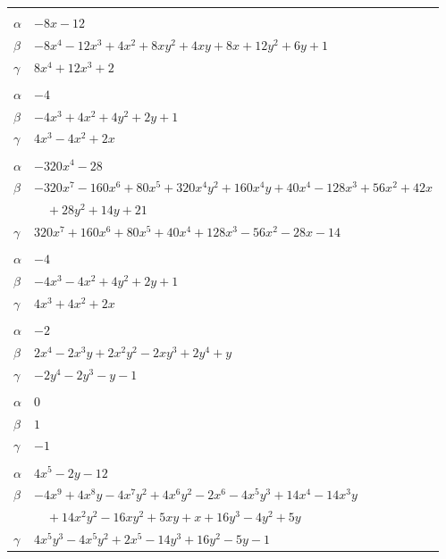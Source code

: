 \documentclass[11pt]{article}
\begin{document}
\begin{longtable}{@{}ll@{}}
\addlinespace[3pt]
\multicolumn{2}{@{}l}{$\{i,j\}=\{1,26\}$, $k_{ij}=3^{2}$}\\
$\alpha$ & $-8x-12$\\
$\beta$ & $-8x^{4}-12x^{3}+4x^{2}+8xy^{2}+4xy+8x+12y^{2}+6y+1$\\
$\gamma$ & $8x^{4}+12x^{3}+2$\\
\addlinespace[3pt]
\multicolumn{2}{@{}l}{$\{i,j\}=\{1,27\}$, $k_{ij}=3$}\\
$\alpha$ & $-4$\\
$\beta$ & $-4x^{3}+4x^{2}+4y^{2}+2y+1$\\
$\gamma$ & $4x^{3}-4x^{2}+2x$\\
\addlinespace[3pt]
\multicolumn{2}{@{}l}{$\{i,j\}=\{1,30\}$, $k_{ij}=3\cdot 7$}\\
$\alpha$ & $-320x^{4}-28$\\
$\beta$ & $-320x^{7}-160x^{6}+80x^{5}+320x^{4}y^{2}+160x^{4}y+40x^{4}-128x^{3}+56x^{2}+42x$\\
 & $\quad +28y^{2}+14y+21$\\
$\gamma$ & $320x^{7}+160x^{6}+80x^{5}+40x^{4}+128x^{3}-56x^{2}-28x-14$\\
\addlinespace[3pt]
\multicolumn{2}{@{}l}{$\{i,j\}=\{1,32\}$, $k_{ij}=3$}\\
$\alpha$ & $-4$\\
$\beta$ & $-4x^{3}-4x^{2}+4y^{2}+2y+1$\\
$\gamma$ & $4x^{3}+4x^{2}+2x$\\
\addlinespace[3pt]
\multicolumn{2}{@{}l}{$\{i,j\}=\{2,4\}$, $k_{ij}=2^{2}$}\\
$\alpha$ & $-2$\\
$\beta$ & $2x^{4}-2x^{3}y+2x^{2}y^{2}-2xy^{3}+2y^{4}+y$\\
$\gamma$ & $-2y^{4}-2y^{3}-y-1$\\
\addlinespace[3pt]
\multicolumn{2}{@{}l}{$\{i,j\}=\{2,12\}$, $k_{ij}=2$}\\
$\alpha$ & $0$\\
$\beta$ & $1$\\
$\gamma$ & $-1$\\
\addlinespace[3pt]
\multicolumn{2}{@{}l}{$\{i,j\}=\{2,25\}$, $k_{ij}=2^{2}\cdot 3$}\\
$\alpha$ & $4x^{5}-2y-12$\\
$\beta$ & $-4x^{9}+4x^{8}y-4x^{7}y^{2}+4x^{6}y^{2}-2x^{6}-4x^{5}y^{3}+14x^{4}-14x^{3}y$\\
 & $\quad +14x^{2}y^{2}-16xy^{2}+5xy+x+16y^{3}-4y^{2}+5y$\\
$\gamma$ & $4x^{5}y^{3}-4x^{5}y^{2}+2x^{5}-14y^{3}+16y^{2}-5y-1$\\

\end{longtable}
\end{document}
